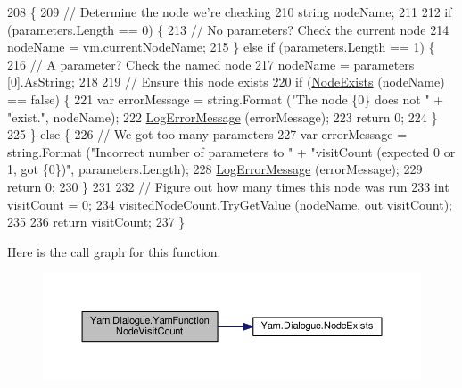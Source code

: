 \begin{DoxyCode}
208         \{
209             \textcolor{comment}{// Determine the node we're checking}
210             \textcolor{keywordtype}{string} nodeName;
211 
212             \textcolor{keywordflow}{if} (parameters.Length == 0) \{
213                 \textcolor{comment}{// No parameters? Check the current node}
214                 nodeName = vm.currentNodeName;
215             \} \textcolor{keywordflow}{else} \textcolor{keywordflow}{if} (parameters.Length == 1) \{
216                 \textcolor{comment}{// A parameter? Check the named node}
217                 nodeName = parameters [0].AsString;
218 
219                 \textcolor{comment}{// Ensure this node exists}
220                 \textcolor{keywordflow}{if} (\hyperlink{a00086_a93bb76a1f9a4058f225ff4cee97483c6}{NodeExists} (nodeName) == \textcolor{keyword}{false}) \{
221                     var errorMessage = string.Format (\textcolor{stringliteral}{"The node \{0\} does not "} + \textcolor{stringliteral}{"exist."}, nodeName);
222                     \hyperlink{a00086_a9801e83dd044d6498fdf6ebcc6bec5ac}{LogErrorMessage} (errorMessage);
223                     \textcolor{keywordflow}{return} 0;
224                 \}
225             \} \textcolor{keywordflow}{else} \{
226                 \textcolor{comment}{// We got too many parameters}
227                 var errorMessage = string.Format (\textcolor{stringliteral}{"Incorrect number of parameters to "} + \textcolor{stringliteral}{"visitCount
       (expected 0 or 1, got \{0\})"}, parameters.Length);
228                 \hyperlink{a00086_a9801e83dd044d6498fdf6ebcc6bec5ac}{LogErrorMessage} (errorMessage);
229                 \textcolor{keywordflow}{return} 0;
230             \}
231 
232             \textcolor{comment}{// Figure out how many times this node was run}
233             \textcolor{keywordtype}{int} visitCount = 0;
234             visitedNodeCount.TryGetValue (nodeName, out visitCount);
235 
236             \textcolor{keywordflow}{return} visitCount;
237         \}
\end{DoxyCode}


Here is the call graph for this function\-:
\nopagebreak
\begin{figure}[H]
\begin{center}
\leavevmode
\includegraphics[width=350pt]{a00086_a10c9f22d3f55e74f091cd6069c431094_cgraph}
\end{center}
\end{figure}





